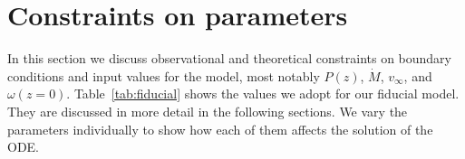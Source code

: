 \section{Constraints on parameters}
\label{sect:parameters}
In this section we discuss observational and theoretical constraints on boundary conditions and input values for the model, most notably $P(z)$, $\dot M$, $v_\infty$, and $\omega(z=0)$. Table~\ref{tab:fiducial} shows the values we adopt for our fiducial model. They are discussed in more detail in the following sections. We vary the parameters individually to show how each of them affects the solution of the ODE. 
